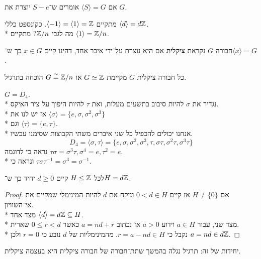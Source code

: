 \begin{definition}
	אם $\langle S \rangle = G$ אומרים ש־$S - e$ יוצרת את $G$.
\end{definition}
\begin{example}
	מתקיים $\langle -1 \rangle = \langle 1 \rangle = \mathbb{Z}$. כקונספט כללי $\langle d \rangle = d\mathbb{Z}$. \\*
	מה לגבי $\mathbb{Z}/n$? מתקיים $\langle 1 \rangle = \mathbb{Z}/n$.
\end{example}
\begin{definition}
	חבורה $G$ נקראת \textbf{ציקלית} אם היא נוצרת על־ידי איבר אחד, דהינו קיים $x \in G$ כך ש־$\langle x \rangle = G$.
\end{definition}
\begin{proposition}
	כל חבורה ציקלית $G$ מקיימת $G \simeq \mathbb{Z}$ או $G \overset{\sim}{=} \mathbb{Z}/n$ הוכחה בתרגיל.
\end{proposition}
\begin{example}
	$G = D_4$. \\*
	נגדיר את $\sigma$ להיות סיבוב בתשעים מעלות, ואת $\tau$ להיות היפוך על ציר האיקס. \\*
	אז יש לנו את $\langle \sigma \rangle = \{e, \sigma, \sigma^2, \sigma^3\}$ \\*
	וגם $\langle \tau \rangle = \{e, \tau\}$. \\*
	אנחנו יכולים להכפיל כל שני איברים משתי הקבוצות שסימנו עכשיו.
	\[
		D_4
		= \langle \sigma, \tau \rangle
		= \{e, \sigma, \sigma^2, \sigma^3,
		\tau, \sigma \tau, \sigma^2 \tau, \sigma^3 \tau \}
	\]
	נראה כי לדוגמה $\tau \sigma = \sigma^3 \tau, \sigma^4 = e, \tau^2 = e$. \\*
	ונראה כי $\tau \sigma \tau^{-1} = \sigma^3 = \sigma^{-1}$.
\end{example}
\begin{proposition}[תת־חבורות של Z]
	לכל $H \le \mathbb{Z}$ קיים $d \ge 0$ יחיד כך ש־$H = d \mathbb{Z}$.
\end{proposition}
\begin{proof}
	אם $H \ne \{0\}$ אז קיים $0 < d \in H$ וניקח את $d$ להיות המינימלי שמקיים את אי־השוויון. \\*
	מצד אחד $\langle d \rangle = d \mathbb{Z} \subseteq H$. \\*
	מצד שני, עבור $a \in H$ וידוע $a > 0$ אז נכתוב $a = nd + r$ כאשר $0 \le r < d$ שארית. \\*
	נקבל כי $r = a - nd \in H$. מהמינימליות של $d$ נובע כי $r = 0$ ולכן $a = nd \in d\mathbb{Z}$.
\end{proof}
יחידות של זה: תרגיל
נגלה בהמשך שתת־חבורה של חבורה ציקלית היא בעצמה ציקלית.

